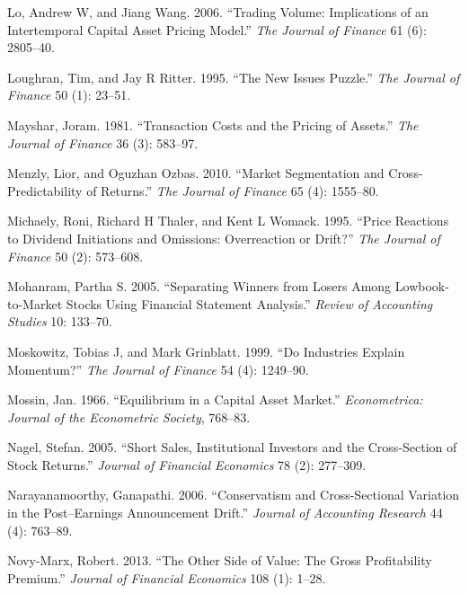 \documentclass[
  letterpaper,
  DIV=11,
  numbers=noendperiod]{scrreprt}
\newlength{\cslhangindent}
\newlength{\cslentryspacingunit} %
\newenvironment{CSLReferences}[2] %
 {%
  \setlength{\parindent}{0pt}
  \ifodd #1
  \let\oldpar\par
  \def\par{\hangindent=\cslhangindent\oldpar}
  \fi
  \setlength{\parskip}{#2\cslentryspacingunit}
 }%
 {}
\begin{document}
\begin{CSLReferences}{1}{0}
\leavevmode{}%
Lo, Andrew W, and Jiang Wang. 2006. {``Trading Volume: Implications of
an Intertemporal Capital Asset Pricing Model.''} \emph{The Journal of
Finance} 61 (6): 2805--40.

\leavevmode{}%
Loughran, Tim, and Jay R Ritter. 1995. {``The New Issues Puzzle.''}
\emph{The Journal of Finance} 50 (1): 23--51.

\leavevmode{}%
Mayshar, Joram. 1981. {``Transaction Costs and the Pricing of Assets.''}
\emph{The Journal of Finance} 36 (3): 583--97.

\leavevmode{}%
Menzly, Lior, and Oguzhan Ozbas. 2010. {``Market Segmentation and
Cross-Predictability of Returns.''} \emph{The Journal of Finance} 65
(4): 1555--80.

\leavevmode{}%
Michaely, Roni, Richard H Thaler, and Kent L Womack. 1995. {``Price
Reactions to Dividend Initiations and Omissions: Overreaction or
Drift?''} \emph{The Journal of Finance} 50 (2): 573--608.

\leavevmode{}%
Mohanram, Partha S. 2005. {``Separating Winners from Losers Among
Lowbook-to-Market Stocks Using Financial Statement Analysis.''}
\emph{Review of Accounting Studies} 10: 133--70.

\leavevmode{}%
Moskowitz, Tobias J, and Mark Grinblatt. 1999. {``Do Industries Explain
Momentum?''} \emph{The Journal of Finance} 54 (4): 1249--90.

\leavevmode{}%
Mossin, Jan. 1966. {``Equilibrium in a Capital Asset Market.''}
\emph{Econometrica: Journal of the Econometric Society}, 768--83.

\leavevmode{}%
Nagel, Stefan. 2005. {``Short Sales, Institutional Investors and the
Cross-Section of Stock Returns.''} \emph{Journal of Financial Economics}
78 (2): 277--309.

\leavevmode{}%
Narayanamoorthy, Ganapathi. 2006. {``Conservatism and Cross-Sectional
Variation in the Post--Earnings Announcement Drift.''} \emph{Journal of
Accounting Research} 44 (4): 763--89.

\leavevmode{}%
Novy-Marx, Robert. 2013. {``The Other Side of Value: The Gross
Profitability Premium.''} \emph{Journal of Financial Economics} 108 (1):
1--28.


\end{CSLReferences}
\end{document}

